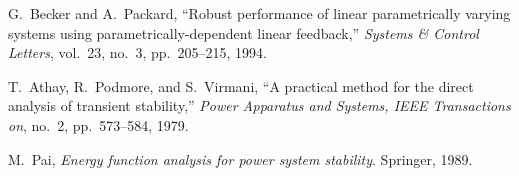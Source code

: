 \documentclass[final,12pt]{elsarticle}
\begin{document}
\begin{thebibliography}{10}
G.~Becker and A.~Packard, ``Robust performance of linear parametrically varying
  systems using parametrically-dependent linear feedback,'' {\em Systems \&
  Control Letters}, vol.~23, no.~3, pp.~205--215, 1994.

T.~Athay, R.~Podmore, and S.~Virmani, ``A practical method for the direct
  analysis of transient stability,'' {\em Power Apparatus and Systems, IEEE
  Transactions on}, no.~2, pp.~573--584, 1979.

M.~Pai, {\em Energy function analysis for power system stability}.
\newblock Springer, 1989.

\end{thebibliography}
\end{document}
